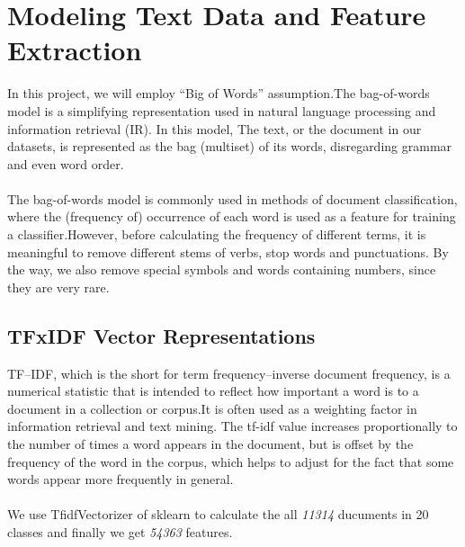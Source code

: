 \documentclass{article}
\begin{document}
\section{Modeling Text Data and Feature Extraction}
In this project, we will employ ``Big of Words'' assumption.The bag-of-words model is a simplifying representation used in natural language processing and information retrieval (IR). In this model, The text, or the document in our datasets, is represented as the bag (multiset) of its words, disregarding grammar and even word order. \\
\\
The bag-of-words model is commonly used in methods of document classification, where the (frequency of) occurrence of each word is used as a feature for training a classifier.However, before calculating the frequency of different terms, it is meaningful to remove different stems of verbs, stop words and punctuations.  By the way, we also remove special symbols and words containing numbers, since they are very rare.
\subsection{TFxIDF Vector Representations}
TF–IDF, which is the short for term frequency–inverse document frequency, is a numerical statistic that is intended to reflect how important a word is to a document in a collection or corpus.It is often used as a weighting factor in information retrieval and text mining. The tf-idf value increases proportionally to the number of times a word appears in the document, but is offset by the frequency of the word in the corpus, which helps to adjust for the fact that some words appear more frequently in general.\\
\\
We use TfidfVectorizer of sklearn to calculate the all \emph{11314} ducuments in 20 classes and finally we get \emph{54363} features.
\end{document}
